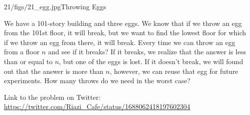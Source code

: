 \begin{problem}{21/figs/21_egg.jpg}{Throwing Eggs}

We have a 101-story building and three eggs. We know that if we throw an egg from the 101st floor, it will break, but we want to find the lowest floor for which if we throw an egg from there, it will break. Every time we can throw an egg from a  floor $n$ and see if it breaks? If it breaks, we realize that the answer is less than or equal to $n$, but one of the eggs is lost. If it doesn't break, we will found out that the answer is more than $n$, however, we can reuse that egg for future experiments. How many throws do we need in the worst case?

Link to the problem on Twitter:  \url{https://twitter.com/Riazi_Cafe/status/1688062418197602304}\end{problem}